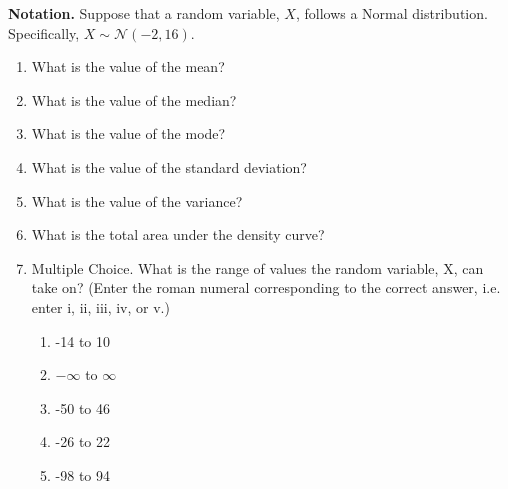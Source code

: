 
\item \textbf{Notation.} Suppose that a random variable, $X$, follows a Normal distribution. Specifically, $X \sim \mathcal{N}(-2, 16)$. 
\begin{enumerate}
\item What is the value of the mean?
\item What is the value of the median?
\item What is the value of the mode?
\item What is the value of the standard deviation?
\item What is the value of the variance?
\item What is the total area under the density curve?
\item Multiple Choice.  What is the range of values the random variable, X, can take on?  (Enter the roman numeral corresponding to the correct answer, i.e. enter i, ii, iii, iv, or v.)
\begin{enumerate}
\item -14 to 10
\item $-\infty$ to $\infty$
\item -50 to 46
\item -26 to 22
\item -98 to 94
\end{enumerate}
\end{enumerate}
